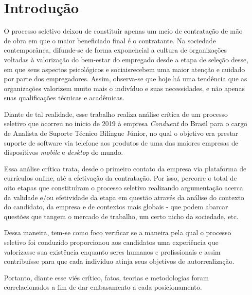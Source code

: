 \documentclass[12pt]{article}
\begin{document}
\section{Introdução}

O processo seletivo deixou de constituir apenas um meio de contratação de mão de obra em que o maior beneficiado final é o contratante. Na sociedade contemporânea, difunde-se de forma exponencial a cultura de organizações voltadas à valorização do bem-estar do empregado desde a etapa de seleção desse, em que seus aspectos psicológicos e sociaisrecebem uma maior atenção e cuidado por parte dos empregadores. Assim, observa-se que hoje há uma tendência que as organizações valorizem muito mais o indivíduo e suas necessidades, e não apenas suas qualificações técnicas e acadêmicas.

Diante de tal realidade, esse trabalho realiza análise crítica de um processo seletivo que ocorreu no início de 2019 à empresa \emph{Conduent} do Brasil para o cargo de Analista de Suporte Técnico Bilíngue Júnior, no qual o objetivo era prestar suporte de software via telefone aos produtos de uma das maiores empresas de dispositivos \emph{mobile} e \emph{desktop} do mundo.

Essa análise crítica trata, desde o primeiro contato da empresa via plataforma de currículos online, até a efetivação da contratação. Por isso, percorre o total de oito etapas que constituíram o processo seletivo realizando argumentação acerca da validade e/ou efetividade da etapa em questão através da análise do contexto do candidato, da empresa e de contextos mais globais - que podem abarcar questões que tangem o mercado de trabalho, um certo nicho da sociedade, etc.

Dessa maneira, tem-se como foco verificar se a maneira pela qual o processo seletivo foi conduzido proporcionou aos candidatos uma experiência que valorizasse sua existência enquanto seres humanos e profissionais e assim contribuísse para que cada indivíduo atinja seus objetivos de autorrealização. 

Portanto, diante esse viés crítico, fatos, teorias e metodologias foram correlacionados a fim de dar embasamento a cada posicionamento.

 
\end{document}
